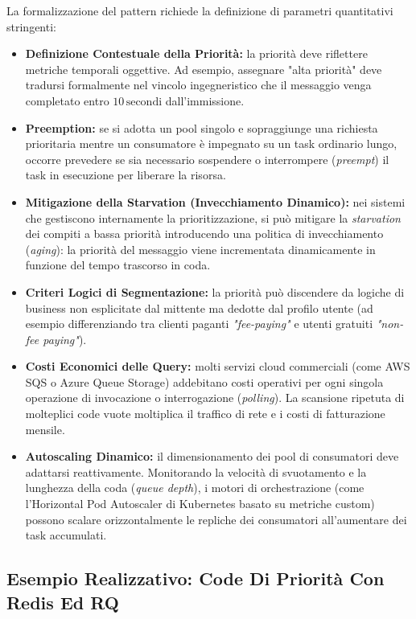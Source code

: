 \documentclass[11pt, a4paper]{article}
\begin{document}
La formalizzazione del pattern richiede la definizione di parametri quantitativi stringenti:
\begin{itemize}
    \item \textbf{Definizione Contestuale della Priorità:} la priorità deve riflettere metriche temporali oggettive. Ad esempio, assegnare "alta priorità" deve tradursi formalmente nel vincolo ingegneristico che il messaggio venga completato entro $10\,\text{secondi}$ dall'immissione.
    \item \textbf{Preemption:} se si adotta un pool singolo e sopraggiunge una richiesta prioritaria mentre un consumatore è impegnato su un task ordinario lungo, occorre prevedere se sia necessario sospendere o interrompere (\emph{preempt}) il task in esecuzione per liberare la risorsa.
    \item \textbf{Mitigazione della Starvation (Invecchiamento Dinamico):} nei sistemi che gestiscono internamente la prioritizzazione, si può mitigare la \emph{starvation} dei compiti a bassa priorità introducendo una politica di invecchiamento (\emph{aging}): la priorità del messaggio viene incrementata dinamicamente in funzione del tempo trascorso in coda.
    \item \textbf{Criteri Logici di Segmentazione:} la priorità può discendere da logiche di business non esplicitate dal mittente ma dedotte dal profilo utente (ad esempio differenziando tra clienti paganti \emph{"fee-paying"} e utenti gratuiti \emph{"non-fee paying"}).
    \item \textbf{Costi Economici delle Query:} molti servizi cloud commerciali (come AWS SQS o Azure Queue Storage) addebitano costi operativi per ogni singola operazione di invocazione o interrogazione (\emph{polling}). La scansione ripetuta di molteplici code vuote moltiplica il traffico di rete e i costi di fatturazione mensile.
    \item \textbf{Autoscaling Dinamico:} il dimensionamento dei pool di consumatori deve adattarsi reattivamente. Monitorando la velocità di svuotamento e la lunghezza della coda (\emph{queue depth}), i motori di orchestrazione (come l'Horizontal Pod Autoscaler di Kubernetes basato su metriche custom) possono scalare orizzontalmente le repliche dei consumatori all'aumentare dei task accumulati.
\end{itemize}

\newpage

\subsection{Esempio Realizzativo: Code Di Priorità Con Redis Ed RQ}
\end{document}
